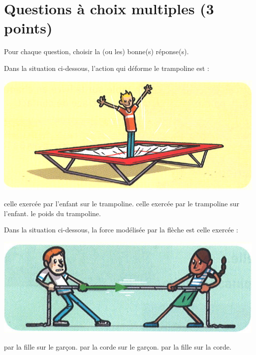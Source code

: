 \section{Questions à choix multiples (3 points)}\label{qcm}
Pour chaque question, choisir la (ou les) bonne(s) réponse(s).

\begin{questions}
	\question[1] Dans la situation ci-dessous, l'action qui déforme le trampoline est :
	
	\begin{multicols}{2}
	
		\begin{center}
			\includegraphics[scale=0.3]{trampo}	
		\end{center}
	
	
		\begin{checkboxes}
			\correctchoice celle exercée par l'enfant sur le trampoline.
			\choice celle exercée par le trampoline sur l'enfant.
			\choice le poids du trampoline.
		\end{checkboxes}
	\end{multicols}

	\question[1] Dans la situation ci-dessous, la force modélisée par la flèche est celle exercée :
	
	\begin{multicols}{2}
		
			
		\begin{center}
			\includegraphics[scale=0.3]{corde}
		\end{center}
		\begin{checkboxes}
			\choice par la fille sur le garçon.
			\correctchoice par la corde sur le garçon.
			\choice par la fille sur la corde.
		\end{checkboxes}
		

\end{multicols}
\end{questions}
